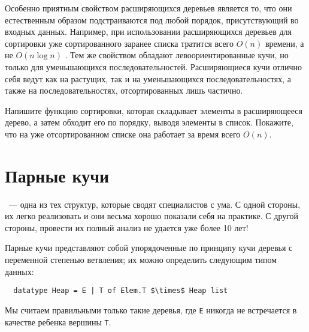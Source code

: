 Особенно приятным свойством расширяющихся деревьев является то, что
они естественным образом подстраиваются под любой порядок,
присутствующий во входных данных. Например, при использовании
расширяющихся деревьев для сортировки уже сортированного заранее
списка тратится всего $O(n)$ времени, а не $O(n \log n)$
\cite{MoffatEddyPetersson1996}. Тем же свойством обладают
левоориентированные кучи, но только для уменьшающихся
последовательностей. Расширяющиеся кучи отлично себя ведут как на
растущих, так и на уменьшающихся последовательностях, а также на
последовательностях, отсортированных лишь частично.

\begin{exercise}\label{ex:5.7}
  Напишите функцию сортировки, которая складывает элементы в
  расширяющееся дерево, а затем обходит его по порядку, выводя
  элементы в список. Покажите, что на уже отсортированном списке она
  работает за время всего $O(n)$.
\end{exercise}

\section{Парные кучи}
\label{sc:5.5}

 \cite{Fredmaneta1986}~--- одна из тех структур, которые
сводят специалистов с ума. С одной стороны, их легко реализовать и они
весьма хорошо показали себя на практике. С другой стороны, провести их
полный анализ не удается уже более 10 лет!

Парные кучи представляют собой упорядоченные по принципу кучи деревья
с переменной степенью ветвления; их можно определить следующим типом
данных:
\begin{lstlisting}
  datatype Heap = E | T of Elem.T $\times$ Heap list
\end{lstlisting}
Мы считаем правильными только такие деревья, где \lstinline!E! никогда
не встречается в качестве ребенка вершины \lstinline!T!.


